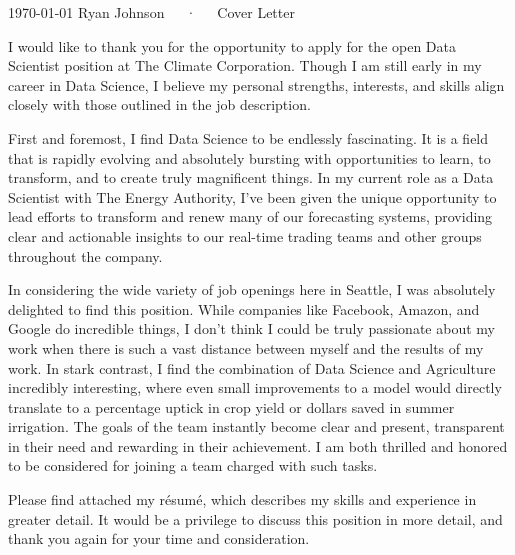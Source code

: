 \documentclass[14pt, a4paper]{awesome-cv}
\begin{document}
\makecvheader[R]

\makecvfooter
  {\today}
  {}
  {Ryan Johnson~~~·~~~Cover Letter}

\makelettertitle

\begin{cvletter}


I would like to thank you for the opportunity to apply for the open Data Scientist position at The Climate Corporation. Though I am still early in my career in Data Science, I believe my personal strengths, interests, and skills align closely with those outlined in the job description.

First and foremost, I find Data Science to be endlessly fascinating. It is a field that is rapidly evolving and absolutely bursting with opportunities to learn, to transform, and to create truly magnificent things. In my current role as a Data Scientist with The Energy Authority, I've been given the unique opportunity to lead efforts to transform and renew many of our forecasting systems, providing clear and actionable insights to our real-time trading teams and other groups throughout the company. 


In considering the wide variety of job openings here in Seattle, I was absolutely delighted to find this position. While companies like Facebook, Amazon, and Google do incredible things, I don't think I could be truly passionate about my work when there is such a vast distance between myself and the results of my work. In stark contrast, I find the combination of Data Science and Agriculture incredibly interesting, where even small improvements to a model would directly translate to a percentage uptick in crop yield or dollars saved in summer irrigation. The goals of the team instantly become clear and present, transparent in their need and rewarding in their achievement. I am both thrilled and honored to be considered for joining a team charged with such tasks.

Please find attached my résumé, which describes my skills and experience in greater detail. It would be a privilege to discuss this position in more detail, and thank you again for your time and consideration.

\end{cvletter}

\makeletterclosing
\end{document}
